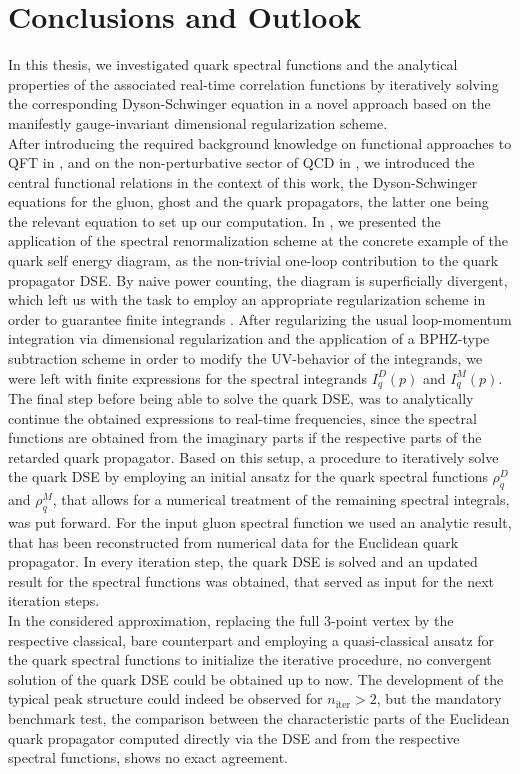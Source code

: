\chapter{Conclusions and Outlook}\label{chap:conclusion}
In this thesis, we investigated quark spectral functions and the analytical properties of the associated real-time correlation functions by iteratively solving the corresponding Dyson-Schwinger equation in a novel approach based on the manifestly gauge-invariant dimensional regularization scheme.\\
After introducing the required background knowledge on functional approaches to QFT in , and on the non-perturbative sector of QCD in , we introduced the central functional relations in the context of this work, the Dyson-Schwinger equations for the gluon, ghost and the quark propagators, the latter one being the relevant equation to set up our computation. In , we presented the application of the spectral renormalization scheme at the concrete example of the quark self energy diagram, as the non-trivial one-loop contribution to the quark propagator DSE. By naive power counting, the diagram is superficially divergent, which left us with the task to employ an appropriate regularization scheme in order to guarantee finite integrands . After regularizing the usual loop-momentum integration via dimensional regularization and the application of a BPHZ-type subtraction scheme in order to modify the UV-behavior of the integrands, we were left with finite expressions for the spectral integrands $I_q^D(p)$ and $I_q^M(p)$. The final step before being able to solve the quark DSE, was to analytically continue the obtained expressions to real-time frequencies, since the spectral functions are obtained from the imaginary parts if the respective parts of the retarded quark propagator. Based on this setup, a procedure to iteratively solve the quark DSE by employing an initial ansatz for the quark spectral functions $\rho_q^D$ and $\rho_q^M$, that allows for a numerical treatment of the remaining spectral integrals, was put forward. For the input gluon spectral function we used an analytic result, that has been reconstructed from numerical data for the Euclidean quark propagator. In every iteration step, the quark DSE is solved and an updated result for the spectral functions was obtained, that served as input for the next iteration steps.\\
In the considered approximation, replacing the full 3-point vertex by the respective classical, bare counterpart and employing a quasi-classical ansatz for the quark spectral functions to initialize the iterative procedure, no convergent solution of the quark DSE could be obtained up to now. The development of the typical peak structure could indeed be observed for $n_{\mathrm{iter}}>2$, but the mandatory benchmark test, the comparison between the characteristic parts of the Euclidean quark propagator computed directly via the DSE and from the respective spectral functions, shows no exact agreement.
